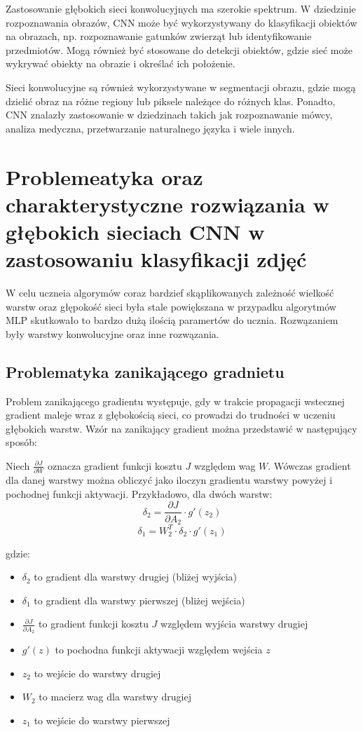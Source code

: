 \documentclass[12pt,twoside]{article}
\begin{document}
  Zastosowanie głębokich sieci konwolucyjnych ma szerokie spektrum. W dziedzinie rozpoznawania obrazów, CNN może być wykorzystywany do klasyfikacji obiektów na obrazach, np. rozpoznawanie gatunków zwierząt lub identyfikowanie przedmiotów. Mogą również być stosowane do detekcji obiektów, gdzie sieć może wykrywać obiekty na obrazie i określać ich położenie.

Sieci konwolucyjne są również wykorzystywane w segmentacji obrazu, gdzie mogą dzielić obraz na różne regiony lub piksele należące do różnych klas. Ponadto, CNN znalazły zastosowanie w dziedzinach takich jak rozpoznawanie mówcy, analiza medyczna, przetwarzanie naturalnego języka i wiele innych.






\clearpage

\section{Problemeatyka oraz charakterystyczne rozwiązania w głębokich sieciach CNN w zastosowaniu klasyfikacji zdjęć } 

W celu uczneia algorymów coraz bardzief skąplikowanych zależność wielkość warstw oraz głępokość sieci była stale powiększana w przypadku algorytmów MLP skutkowało to bardzo dużą ilością 
paramertów do ucznia. Rozwązaniem były warstwy konwolucyjne oraz inne rozwązania. 

\subsection{Problematyka zanikającego gradnietu}

Problem zanikającego gradientu występuje, gdy w trakcie propagacji wstecznej gradient maleje wraz z głębokością sieci, co prowadzi do trudności w uczeniu głębokich warstw. Wzór na zanikający gradient można przedstawić w następujący sposób:

Niech $\frac{\partial J}{\partial W}$ oznacza gradient funkcji kosztu $J$ względem wag $W$. Wówczas gradient dla danej warstwy można obliczyć jako iloczyn gradientu warstwy powyżej i pochodnej funkcji aktywacji. Przykładowo, dla dwóch warstw:
$$\delta_2 = \frac{\partial J}{\partial A_2} \cdot g'(z_2)$$
$$\delta_1 = W_2^T \cdot \delta_2 \cdot g'(z_1)$$

gdzie:
\begin{itemize}
	\item $\delta_2$ to gradient dla warstwy drugiej (bliżej wyjścia)
	\item $\delta_1$ to gradient dla warstwy pierwszej (bliżej wejścia)
	\item $\frac{\partial J}{\partial A_2}$ to gradient funkcji kosztu $J$ względem wyjścia warstwy drugiej
	\item $g'(z)$ to pochodna funkcji aktywacji względem wejścia $z$
	\item $z_2$ to wejście do warstwy drugiej
	\item $W_2$ to macierz wag dla warstwy drugiej
	\item $z_1$ to wejście do warstwy pierwszej
\end{itemize}
\end{document}
